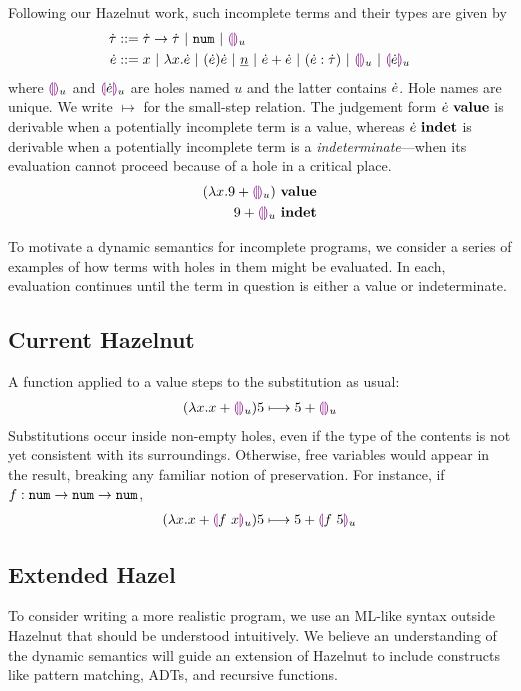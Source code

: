 Following our Hazelnut work, such incomplete terms and their types are
given by
\begin{align*}
  \dot{\tau} & ::=
  \dot{\tau} \rightarrow \dot{\tau} ~\vert~
  \texttt{num} ~\vert~
  \textcolor{violet}{\llparenthesis}\textcolor{violet}{\rrparenthesis}_{u}
  \\
  \dot{e} & ::=   x ~\vert~
  \lambda x.\dot{e} ~\vert~
  (\dot{e})\dot{e} ~\vert~
  \underline{n} ~\vert~
  \dot{e} + \dot{e} ~\vert~
  (\dot{e} : \dot{\tau}) ~\vert~
  \textcolor{violet}{\llparenthesis}\textcolor{violet}{\rrparenthesis}_{u} ~\vert~
  \textcolor{violet}{\llparenthesis}\dot{e}\textcolor{violet}{\rrparenthesis}_{u}
\end{align*}
where $\textcolor{violet}{\llparenthesis}\textcolor{violet}{\rrparenthesis}_{u}$ and $\textcolor{violet}{\llparenthesis}\dot{e}\textcolor{violet}{\rrparenthesis}_{u}$ are holes named $u$ and the
latter contains $\dot{e}$. Hole names are unique. We write $\mapsto$ for the
small-step relation. The judgement form ${\dot{e}} ~\mathbf{value}$ is derivable when a
potentially incomplete term is a value, whereas ${\dot{e}} ~\mathbf{indet}$ is
derivable when a potentially incomplete term is a
\textit{indeterminate}---when its evaluation cannot proceed because of a
hole in a critical place.
\begin{align*}
  {(\lambda x. 9 + \textcolor{violet}{\llparenthesis}\textcolor{violet}{\rrparenthesis}_{u})} ~\mathbf{value}\\
  {9 + \textcolor{violet}{\llparenthesis}\textcolor{violet}{\rrparenthesis}_{u}} ~\mathbf{indet}
\end{align*}

To motivate a dynamic semantics for incomplete programs, we consider a
series of examples of how terms with holes in them might be evaluated. In
each, evaluation continues until the term in question is either a value or
indeterminate.

\subsection{Current Hazelnut}
A function applied to a value steps to the substitution as usual:
\begin{align*}
      {
        (\lambda x.x + \textcolor{violet}{\llparenthesis}\textcolor{violet}{\rrparenthesis}_{u})5
      } \longmapsto {
        5 + \textcolor{violet}{\llparenthesis}\textcolor{violet}{\rrparenthesis}_{u}
      }
\end{align*}
Substitutions occur inside non-empty holes, even if the type of the
contents is not yet consistent with its surroundings. Otherwise, free
variables would appear in the result, breaking any familiar notion of
preservation. For instance, if $f : \texttt{num} \rightarrow \texttt{num} \rightarrow \texttt{num}$,
\begin{align*}
  {
        (\lambda x.x + \textcolor{violet}{\llparenthesis}f~x\textcolor{violet}{\rrparenthesis}_{u})5
      } \longmapsto {
        5 + \textcolor{violet}{\llparenthesis}f~5\textcolor{violet}{\rrparenthesis}_{u}
      }
\end{align*}

\subsection{Extended Hazel}
To consider writing a more realistic program, we use an ML-like syntax
outside Hazelnut that should be understood intuitively. We believe an
understanding of the dynamic semantics will guide an extension of Hazelnut
to include constructs like pattern matching, ADTs, and recursive functions.

